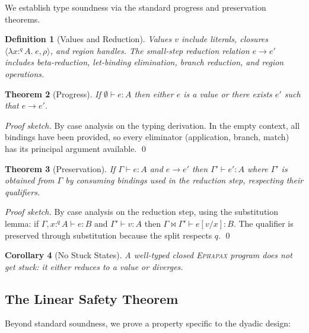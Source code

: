 \documentclass[11pt,a4paper]{article}
\newtheorem{theorem}{Theorem}[section]
\newtheorem{corollary}[theorem]{Corollary}
\newtheorem{definition}[theorem]{Definition}
\newcommand{\Ephapax}{\textsc{Ephapax}}
\newcommand{\ctx}{\Gamma}
\newcommand{\judge}[3]{#1 \vdash #2 : #3}
\begin{document}
We establish type soundness via the standard progress and preservation theorems.

\begin{definition}[Values and Reduction]
Values $v$ include literals, closures $\langle \lambda x :^q A.\; e, \rho \rangle$,
and region handles. The small-step reduction relation $e \longrightarrow e'$
includes beta-reduction, let-binding elimination, branch reduction, and region
operations.
\end{definition}

\begin{theorem}[Progress]
\label{thm:progress}
If $\judge{\emptyset}{e}{A}$ then either $e$ is a value or there exists $e'$
such that $e \longrightarrow e'$.
\end{theorem}

\begin{proof}[Proof sketch]
By case analysis on the typing derivation. In the empty context, all bindings
have been provided, so every eliminator (application, branch, match) has its
principal argument available. \qed
\end{proof}

\begin{theorem}[Preservation]
\label{thm:preservation}
If $\judge{\ctx}{e}{A}$ and $e \longrightarrow e'$ then $\judge{\ctx'}{e'}{A}$
where $\ctx'$ is obtained from $\ctx$ by consuming bindings used in the
reduction step, respecting their qualifiers.
\end{theorem}

\begin{proof}[Proof sketch]
By case analysis on the reduction step, using the substitution lemma: if
$\judge{\ctx, x :^q A}{e}{B}$ and $\judge{\ctx'}{v}{A}$ then
$\judge{\ctx \bowtie \ctx'}{e[v/x]}{B}$. The qualifier is preserved through
substitution because the split respects $q$. \qed
\end{proof}

\begin{corollary}[No Stuck States]
A well-typed closed \Ephapax{} program does not get stuck: it either reduces
to a value or diverges.
\end{corollary}

\subsection{The Linear Safety Theorem}

Beyond standard soundness, we prove a property specific to the dyadic design:
\end{document}
